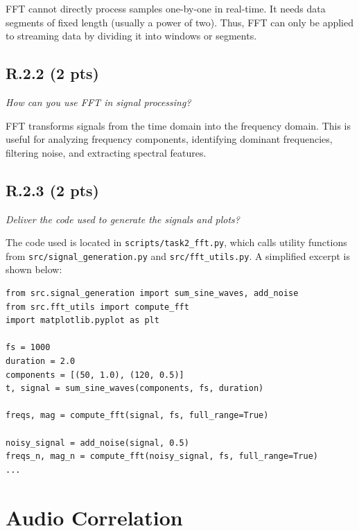 \documentclass{article}
\begin{document}
FFT cannot directly process samples one-by-one in real-time. It needs data segments of fixed length (usually a power of two). Thus, FFT can only be applied to streaming data by dividing it into windows or segments.

\subsection*{R.2.2 (2 pts)}
\emph{How can you use FFT in signal processing?}

FFT transforms signals from the time domain into the frequency domain. This is useful for analyzing frequency components, identifying dominant frequencies, filtering noise, and extracting spectral features.

\subsection*{R.2.3 (2 pts)}
\emph{Deliver the code used to generate the signals and plots?}

The code used is located in \texttt{scripts/task2\_fft.py}, which calls utility functions from \texttt{src/signal\_generation.py} and \texttt{src/fft\_utils.py}. A simplified excerpt is shown below:

\begin{verbatim}
from src.signal_generation import sum_sine_waves, add_noise
from src.fft_utils import compute_fft
import matplotlib.pyplot as plt

fs = 1000
duration = 2.0
components = [(50, 1.0), (120, 0.5)]
t, signal = sum_sine_waves(components, fs, duration)

freqs, mag = compute_fft(signal, fs, full_range=True)

noisy_signal = add_noise(signal, 0.5)
freqs_n, mag_n = compute_fft(noisy_signal, fs, full_range=True)
...
\end{verbatim}



\section{ Audio Correlation}
\end{document}
